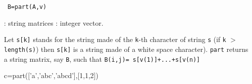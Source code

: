 
\begin{mandesc}
\end{mandesc}
\begin{calling_sequence}
\begin{verbatim}
 B=part(A,v)  
\end{verbatim}
\end{calling_sequence}
\begin{parameters}
  \begin{varlist}
     : string matrices
     : integer vector.
  \end{varlist}
\end{parameters}
\begin{mandescription}
  Let \verb!s[k]! stands for the string made of the \verb!k!-th 
  character of string \verb!s! (if \verb!k! $>$ \verb+length(s)+) then 
  \verb+s[k]+ is a string made of a white space character). 
  \verb!part! returns a string matrix, say \verb+B+, such that 
  \verb!B(i,j)= s[v(1)]+...+s[v(n)]!
\end{mandescription}
\begin{examples}
  \begin{program}
    c=part(['a','abc','abcd'],[1,1,2])
  \end{program}
\end{examples}
\begin{manseealso}
     
\end{manseealso}

